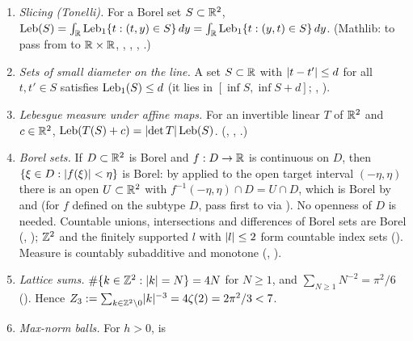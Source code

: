 {\raggedright
\begin{enumerate}[label=(W7-E\arabic*),ref=(W7-E\arabic*)]
\item\label{bpW:w7:ext-tonelli} \emph{Slicing (Tonelli).} For a Borel set $S\subset\mathbb{R}^2$,
  $\operatorname{Leb}(S)=\int_{\mathbb{R}}\operatorname{Leb}_1\{t:(t,y)\in S\}\,dy=\int_{\mathbb{R}}\operatorname{Leb}_1\{t:(y,t)\in S\}\,dy$. (Mathlib:
   to pass from  to $\mathbb{R}\times\mathbb{R}$,
  , ,
  , .)
\item\label{bpW:w7:ext-diam} \emph{Sets of small diameter on the line.} A set $S\subset\mathbb{R}$ with
  $\lvert t-t'\rvert\le d$ for all $t,t'\in S$ satisfies $\operatorname{Leb}_1(S)\le d$ (it lies in $[\inf S,\inf S+d]$;
  , ).
\item\label{bpW:w7:ext-linear} \emph{Lebesgue measure under affine maps.} For an invertible linear $T$ of $\mathbb{R}^2$ and
  $c\in\mathbb{R}^2$, $\operatorname{Leb}(T(S)+c)=\lvert \det T\rvert\operatorname{Leb}(S)$. (,
  , .)
\item\label{bpW:w7:ext-borel} \emph{Borel sets.} If $D\subset\mathbb{R}^2$ is Borel and $f:D\to\mathbb{R}$ is continuous on $D$,
  then $\{\xi\in D:\lvert f(\xi)\rvert<\eta\}$ is Borel: by  applied to the open target
  interval $(-\eta,\eta)$ there is an open $U\subset\mathbb{R}^2$ with $f^{-1}(-\eta,\eta)\cap D=U\cap D$, which is Borel by
   and  (for $f$ defined on the subtype $D$, pass first to
   via ). No openness of $D$ is needed. Countable unions, intersections and differences of Borel sets are
  Borel (, ); $\mathbb{Z}^2$ and the finitely supported $l$ with
  $\lvert l\rvert\le2$ form countable index sets (). Measure is countably subadditive and monotone
  (, ).
\item\label{bpW:w7:ext-zeta} \emph{Lattice sums.} $\#\{k\in\mathbb{Z}^2:\lvert k\rvert=N\}=4N$ for $N\ge1$, and
  $\sum_{N\ge1}N^{-2}=\pi^2/6$ (). Hence
  $Z_3:=\sum_{k\in\mathbb{Z}^2\setminus0}\lvert k\rvert^{-3}=4\zeta(2)=2\pi^2/3<7$.
\item\label{bpW:w7:ext-ball} \emph{Max-norm balls.} For $h>0$,  is

\end{enumerate}}
